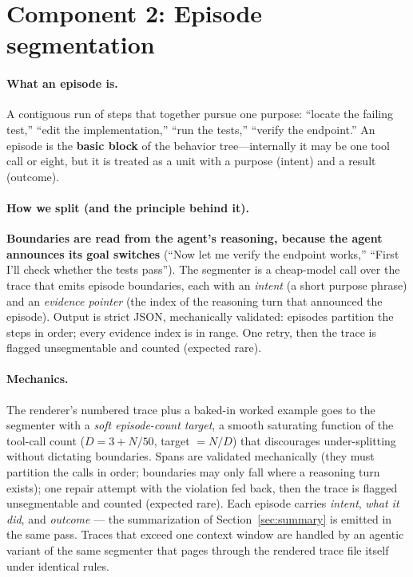 \documentclass[11pt]{article}
\begin{document}
\section{Component 2: Episode segmentation}
\label{sec:segment}

\paragraph{What an episode is.} A contiguous run of steps that together pursue
one purpose: ``locate the failing test,'' ``edit the implementation,'' ``run the
tests,'' ``verify the endpoint.'' An episode is the \textbf{basic block} of the
behavior tree---internally it may be one tool call or eight, but it is treated as
a unit with a purpose (intent) and a result (outcome).

\paragraph{How we split (and the principle behind it).} \textbf{Boundaries are
read from the agent's reasoning, because the agent announces its goal switches}
(``Now let me verify the endpoint works,'' ``First I'll check whether the tests
pass''). The segmenter is a cheap-model call over the trace that emits episode
boundaries, each with an \emph{intent} (a short purpose phrase) and an
\emph{evidence pointer} (the index of the reasoning turn that announced the
episode). Output is strict JSON, mechanically validated: episodes partition the
steps in order; every evidence index is in range. One retry, then the trace is
flagged unsegmentable and counted (expected rare).

\paragraph{Mechanics.} The renderer's numbered trace plus a baked-in worked
example goes to the segmenter with a \emph{soft episode-count target}, a smooth
saturating function of the tool-call count ($D = 3 + N/50$, target $= N/D$) that
discourages under-splitting without dictating boundaries. Spans are validated
mechanically (they must partition the calls in order; boundaries may only fall
where a reasoning turn exists); one repair attempt with the violation fed back,
then the trace is flagged unsegmentable and counted (expected rare). Each
episode carries \emph{intent}, \emph{what it did}, and \emph{outcome} --- the
summarization of Section~\ref{sec:summary} is emitted in the same pass. Traces
that exceed one context window are handled by an agentic variant of the same
segmenter that pages through the rendered trace file itself under identical
rules.
\end{document}
